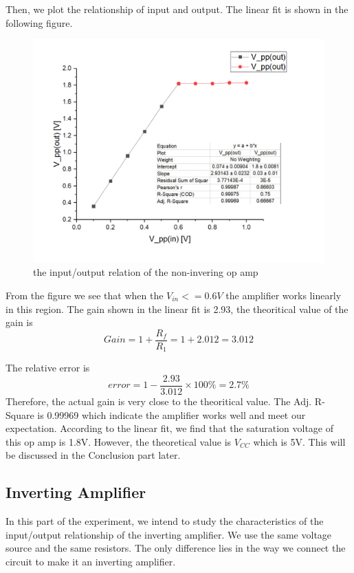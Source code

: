 \documentclass[12pt,a4paper]{article}
\begin{document}
Then, we plot the relationship of input and output. The linear fit is shown in the following figure.
  \begin{figure}[H]
  \centering
  \includegraphics[width=.8\textwidth]{Figure8.png}
  \caption{the input/output relation of the non-invering op amp}
  \label{img} 
\end{figure}

From the figure we see that when the $V_{in} <= 0.6V$ the amplifier works linearly in this region.
The gain shown in the linear fit is 2.93, the theoritical value of the gain is 
$$Gain = 1+\frac{R_{f}}{R_1} = 1+2.012 = 3.012$$

The relative error is $$error = 1- \frac{2.93}{3.012}\times 100\% = 2.7\%$$
Therefore, the actual gain is very close to the theoritical value.
 The Adj. R-Square is 0.99969 which indicate the amplifier works well and meet our expectation. According to the linear fit, we find that the saturation voltage of this op amp is 1.8V. However, the theoretical value is $V_{CC}$ which is 5V. This will be discussed in the Conclusion part later.


\subsection{Inverting Amplifier}
In this part of the experiment, we intend to study the characteristics of the input/output relationship of the inverting amplifier. We use the same voltage source and the same resistors. The only difference lies in the way we connect the circuit to make it an inverting amplifier.
\end{document}
